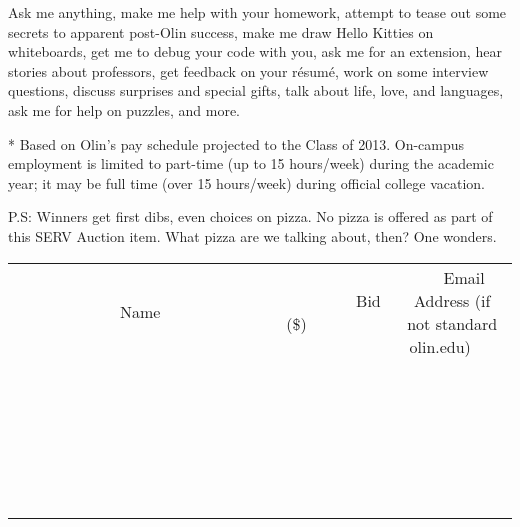 \documentclass[11pt]{article}
\begin{document}
Ask me anything, make me help with your homework, attempt to tease out some secrets to apparent post-Olin success, make me draw Hello Kitties on whiteboards, get me to debug your code with you, ask me for an extension, hear stories about professors, get feedback on your résumé, work on some interview questions, discuss surprises and special gifts, talk about life, love, and languages, ask me for help on puzzles, and more.

* Based on Olin's pay schedule projected to the Class of 2013. On-campus employment is limited to part-time (up to 15 hours/week) during the academic year; it may be full time (over 15 hours/week) during official college vacation.

P.S: Winners get first dibs, even choices on pizza. No pizza is offered as part of this SERV Auction item. What pizza are we talking about, then? One wonders.
\\[6ex]
\begin{tabular}{c c c}
~~~~~~~~~~~~~Name~~~~~~~~~~~~~ & ~~~~~~~~~Bid (\$)~~~~~~~~~  & ~~~Email Address (if not standard olin.edu)~~~\\
 & & \\
\hline
 & & \\
\hline
 & & \\
\hline
 & & \\
\hline
 & & \\
\hline
 & & \\
\hline
 & & \\
\hline
 & & \\
\hline
 & & \\
\hline
 & & \\
\hline
 & & \\
\hline
 & & \\
\hline
 & & \\
\hline
 & & \\
\hline
 & & \\
\hline
 & & \\
\hline
 & & \\
\hline
 & & \\
\hline
 & & \\
\hline
 & & \\
\hline
 & & \\
\hline
 & & \\
\hline
 & & \\
\hline
 & & \\
\hline
 & & \\
\hline
 & & \\
\hline
\end{tabular}
\newpage
\end{document}
